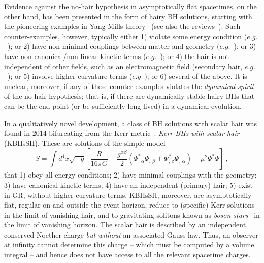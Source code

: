 Evidence against the no-hair hypothesis in asymptotically flat spacetimes, on the other hand, has been presented in the form of hairy BH solutions, starting with the pioneering examples in Yang-Mills theory~\cite{Volkov:1998cc} (see also the reviews~\cite{Bizon:1994dh,Bekenstein:1996pn,Herdeiro:2015waa,Volkov:2016ehx}). 
Such counter-examples, however, typically either 
1) violate some energy condition ($e.g.$~\cite{Nucamendi:1995ex,Bechmann:1995sa,Anabalon:2013qua,Anabalon:2012ih,Cadoni:2015gfa}); or 
2) have non-minimal couplings between matter and geometry ($e.g.$~\cite{Bekenstein:1975ts,Bekenstein:1974sf,BBM,Sotiriou:2014pfa,Sotiriou:2013qea,Babichev:2013cya}); or 
3) have non-canonical/non-linear kinetic terms ($e.g.$~\cite{Luckock:1986tr,Luckock,Bronnikov:2005gm,Radu:2011uj}); or 
4) the hair is not independent of other fields, such as an electromagnetic field (secondary hair, $e.g.$~\cite{Gibbons:1987ps,Gibbons:1982ih}); or 
5) involve higher curvature terms 
($e.g$~\cite{Kanti:1995vq,Ayzenberg:2014aka,Kleihaus:2011tg,Kleihaus:2015aje,Pani:2011gy,Pani:2009wy,Alexander:2009tp,Yunes:2009hc}); or 
6) several of the above. It is unclear, moreover, if any of these counter-examples violates the \textit{dynamical spirit} of the no-hair hypothesis; that is, if there are dynamically stable hairy BHs that can be the end-point (or be sufficiently long lived) in a dynamical evolution.

\bigskip

In a qualitatively novel development, a class of BH solutions with scalar hair was found in 2014 bifurcating from the Kerr metric~\cite{Herdeiro:2014goa}: \textit{Kerr BHs with scalar hair} (KBHsSH).
%
 These are solutions of the simple model
 \begin{equation}
\label{actionscalar}
S=\int  d^4x \sqrt{-g}\left[ \frac{R}{16\pi G}
   -\frac{g^{\alpha\beta}}{2} \left( \Psi_{, \, \alpha}^* \Psi_{, \, \beta} + \Psi _
{, \, \beta}^* \Psi _{, \, \alpha} \right) - \mu^2 \Psi^*\Psi
 \right]  \ ,
\end{equation}
that 1) obey all energy conditions; 2) have minimal couplings with the geometry; 3) have canonical kinetic terms; 4) have an independent (primary) hair; 5) exist in GR, without higher curvature terms. KBHsSH, moreover, are asymptotically flat, regular on and outside the event horizon, reduce to (specific) Kerr solutions in the limit of vanishing hair, and to gravitating solitons known as \textit{boson stars}~\cite{Schunck:2003kk,Liebling:2012fv} in the limit of vanishing horizon. The scalar hair is described by an independent  conserved Noether charge \textit{but without} an associated Gauss law. Thus, an observer at infinity cannot determine this charge -- which must be computed by a volume integral -- and hence does not have access to all the relevant spacetime charges.  


